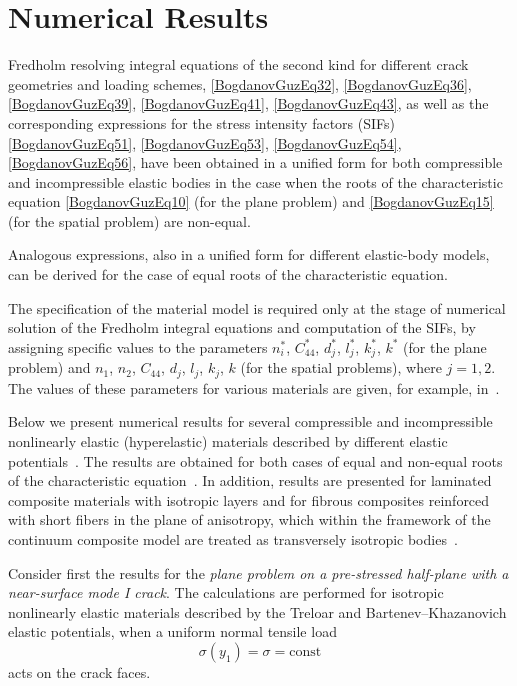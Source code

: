 \section{Numerical Results}

Fredholm resolving integral equations of the second kind for different crack
geometries and loading schemes,
\eqref{BogdanovGuzEq32}, \eqref{BogdanovGuzEq36},
\eqref{BogdanovGuzEq39}, \eqref{BogdanovGuzEq41},
\eqref{BogdanovGuzEq43}, as well as the corresponding expressions for the
stress intensity factors (SIFs)
\eqref{BogdanovGuzEq51}, \eqref{BogdanovGuzEq53},
\eqref{BogdanovGuzEq54}, \eqref{BogdanovGuzEq56},
have been obtained in a unified form for both compressible and
incompressible elastic bodies in the case when the roots of the
characteristic equation \eqref{BogdanovGuzEq10} (for the plane problem)
and \eqref{BogdanovGuzEq15} (for the spatial problem) are non-equal.

Analogous expressions, also in a unified form for different elastic-body
models, can be derived for the case of equal roots of the characteristic
equation.

The specification of the material model is required only at the stage of
numerical solution of the Fredholm integral equations and computation of
the SIFs, by assigning specific values to the parameters
$n_{i}^{*}$, $C_{44}^{*}$, $d_{j}^{*}$, $l_{j}^{*}$, $k_{j}^{*}$, $k^{*}$
(for the plane problem) and
$n_{1}$, $n_{2}$, $C_{44}$, $d_{j}$, $l_{j}$, $k_{j}$, $k$
(for the spatial problems), where $j=1,2$.
The values of these parameters for various materials are given,
for example, in~\cite{BogdanovGuz10,BogdanovGuz31,BogdanovGuz32}.

Below we present numerical results for several compressible and incompressible
nonlinearly elastic (hyperelastic) materials described by different elastic
potentials~\cite{BogdanovGuz51}. The results are obtained for both cases of
equal and non-equal roots of the characteristic equation~\cite{BogdanovGuz28}.
In addition, results are presented for laminated composite materials with
isotropic layers and for fibrous composites reinforced with short fibers in
the plane of anisotropy, which within the framework of the continuum composite
model are treated as transversely isotropic bodies~\cite{BogdanovGuz15}.

\medskip

Consider first the results for the \textit{plane problem on a pre-stressed
	half-plane with a near-surface mode I crack}. The calculations are performed
for isotropic nonlinearly elastic materials described by the Treloar and
Bartenev--Khazanovich elastic potentials, when a uniform normal tensile load
\begin{equation}
	\label{BogdanovGuzEq59}
	\sigma(y_{1})=\sigma=\text{const}
\end{equation}
acts on the crack faces.

